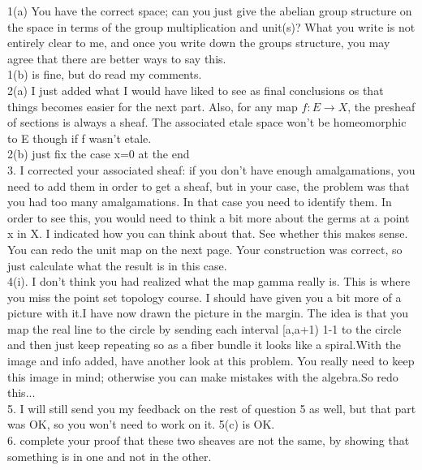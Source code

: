 1(a)  You have the correct space; can you just give the abelian group structure on the space in terms of the group multiplication and unit(s)? What you write is not entirely clear to me, and once you write down the groups structure, you may agree that there are better ways to say this.\\

1(b) is fine, but do read my comments.\\

2(a)  I just added what I would have liked to see as final conclusions os that things becomes easier for the next part. Also, for any map $f:E \rightarrow X$, the presheaf of sections is always a sheaf. The associated etale space won't be homeomorphic to E though if f wasn't etale.\\

2(b) just fix the case x=0 at the end\\

3.  I corrected your associated sheaf: if you don't have enough amalgamations, you need to add them in order to get a sheaf, but in your case, the problem was that you had too many amalgamations. In that case you need to identify them. In order to see this, you would need to think a bit more about the germs at a point x in X. I indicated how you can think about that. See whether this makes sense.
You can redo the unit map on the next page. Your construction was correct, so just calculate what the result is in this case.\\

4(i).  I don't think you had realized what the map gamma really is. This is where you miss the point set topology course. I should have given you a bit more of a picture with it.I have now drawn the picture in the margin. The idea is that you map the real line  to the circle by  sending each interval [a,a+1) 1-1 to the circle and then just keep repeating so as a fiber bundle it looks like a spiral.With the image and info added, have another look at this problem. You really need to keep this image in mind; otherwise you can make mistakes with the algebra.So redo this...\\

5. I will still send you my feedback on the rest of question 5 as well, but that part was OK, so you won't need to work on it. 5(c) is OK.\\

6. complete your proof that these two sheaves are not the same, by showing that something is in one and not in the other.

